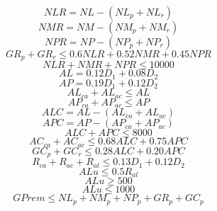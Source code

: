\begin{equation}
NLR = NL - (NL_{p} + NL_{r}) 
\end{equation}
\begin{equation}
NMR = NM - (NM_{p} + NM_{r}) 
\end{equation}
\begin{equation}
NPR = NP - (NP_{p} + NP_{r}) 
\end{equation}
\begin{equation}
GR_{p} + GR_{r} \leq 0.6 NLR + 0.52 NMR + 0.45 NPR 
\end{equation}
\begin{equation}
NLR + NMR + NPR \leq 10000 
\end{equation}
\begin{equation}
AL = 0.12D_{1}+0.08D_{2}
\end{equation}
\begin{equation}
AP = 0.19D_{1}+0.12D_{2}
\end{equation}
\begin{equation}
AL_{ca} + AL_{ac} \leq AL
\end{equation}
\begin{equation}
AP_{ca} + AP_{ac} \leq AP
\end{equation}
\begin{equation}
ALC = AL - (AL_{ca} + AL_{ac})
\end{equation}
\begin{equation}
APC = AP - (AP_{ca} + AP_{ac})
\end{equation}
\begin{equation}
ALC + APC \leq 8000 
\end{equation}
\begin{equation}
AC_{ca} + AC_{ac} \leq 0.68 ALC + 0.75 APC
\end{equation}
\begin{equation}
GC_{p} + GC_{r} \leq 0.28 ALC + 0.20 APC
\end{equation}
\begin{equation}
R_{ca} + R_{ac} + R_{al} \leq 0.13D_{1} + 0.12D_{2} 
\end{equation}
\begin{equation}
ALu \leq 0.5 R_{al} 
\end{equation}
\begin{equation}
ALu \geq 500 
\end{equation}
\begin{equation}
ALu \leq 1000 
\end{equation}
\begin{equation}
GPrem \leq NL_{p}+NM_{p}+NP_{p}+GR_{p}+GC_{p}
\end{equation}
